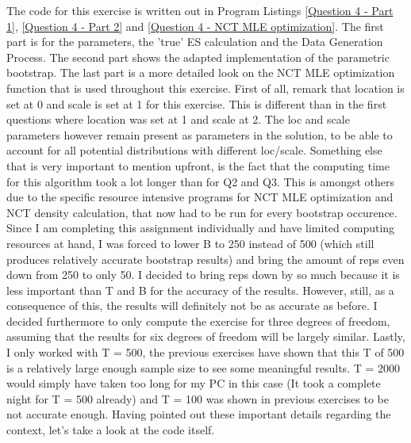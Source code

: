 \documentclass[12pt]{article}
\begin{document}
The code for this exercise is written out in Program Listings \ref{Question 4 - Part 1}, \ref{Question 4 - Part 2} and \ref{Question 4 - NCT MLE optimization}. \newline The first part is for the parameters, the 'true' ES calculation and the Data Generation Process. The second part shows the adapted implementation of the parametric bootstrap. The last part is a more detailed look on the NCT MLE optimization function that is used throughout this exercise.\newline
First of all, remark that location is set at 0 and scale is set at 1 for this exercise. This is different than in the first questions where location was set at 1 and scale at 2. The loc and scale parameters however remain present as parameters in the solution, to be able to account for all potential distributions with different loc/scale. \newline\newline
Something else that is very important to mention upfront, is the fact that the computing time for this algorithm took a lot longer than for Q2 and Q3. This is amongst others due to the specific resource intensive programs for NCT MLE optimization and NCT density calculation, that now had to be run for every bootstrap occurence. \newline
Since I am completing this assignment individually and have limited computing resources at hand, I was forced to lower B to 250 instead of 500 (which still produces relatively accurate bootstrap results) and bring the amount of reps even down from 250 to only 50. I decided to bring reps down by so much because it is less important than T and B for the accuracy of the results. However, still, as a consequence of this, the results will definitely not be as accurate as before. \newline \newline I decided furthermore to only compute the exercise for three degrees of freedom, assuming that the results for six degrees of freedom will be largely similar. Lastly, I only worked with T = 500, the previous exercises have shown that this T of 500 is a relatively large enough sample size to see some meaningful results. T = 2000 would simply have taken too long for my PC in this case (It took a complete night for T = 500 already) and T = 100 was shown in previous exercises to be not accurate enough. Having pointed out these important details regarding the context, let's take a look at the code itself.
\newline
\newline
\end{document}
